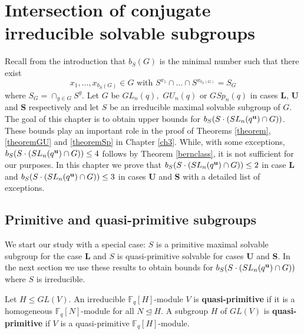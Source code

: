 \chapter{Intersection of conjugate irreducible solvable subgroups}
\label{ch2}

 Recall from the introduction that $b_S(G)$ is the minimal number such that there exist $$x_1, \ldots, x_{b_S(G)} \in G  \text{ with } S^{x_1} \cap \ldots \cap S^{x_{b_S(G)}}=S_G$$ where $S_G= \cap _{g \in G}S^g$.  Let ${G}$ be  $GL_n(q),$ $GU_n(q)$ or $GSp_n(q)$ in cases {\bf L}, {\bf U} and {\bf S} respectively and let $S$ be an irreducible maximal solvable subgroup of $G$.  The goal of this chapter is to obtain upper bounds for $b_S(S \cdot (SL_n(q^{\bf u}) \cap {G}))$. These bounds play an important role in the proof of Theorems \ref{theorem}, \ref{theoremGU} and \ref{theoremSp} in Chapter \ref{ch3}.  While, with some exceptions,  $b_S(S \cdot (SL_n(q^{\bf u}) \cap {G})) \le 4$ follows by Theorem \ref{bernclass}, it is not sufficient for our purposes. In this chapter we prove that  $b_S(S \cdot (SL_n(q^{\bf u}) \cap {G})) \le 2$ in case {\bf L} and $b_S(S \cdot (SL_n(q^{\bf u}) \cap {G}))\le 3$ in cases {\bf U} and {\bf S} with a detailed list of exceptions. 


\section{Primitive and quasi-primitive subgroups} 


    We start our study with a special case:  $S$ is a primitive maximal solvable  subgroup for the case {\bf L} and $S$ is quasi-primitive solvable for cases {\bf U} and {\bf S}. In the next section  we use these results to obtain bounds for $b_S(S \cdot (SL_n(q^{\bf u}) \cap {G}))$ where $S$ is irreducible.  


\begin{Def}
Let $H \le GL(V).$ An irreducible $\mathbb{F}_q[H]$-module $V$ is {\bf quasi-primitive}  if it is a homogeneous $\mathbb{F}_q[N]$-module for all $N \trianglelefteq H.$ A subgroup $H$ of $GL(V)$ is {\bf quasi-primitive} if $V$ is a {quasi-primitive}
$\mathbb{F}_q[H]$-module.
\end{Def}

